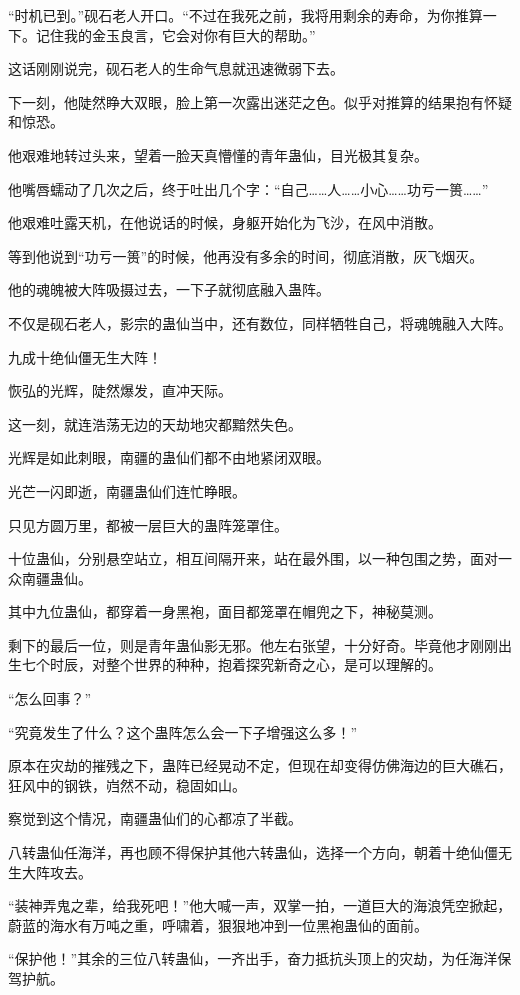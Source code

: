 \begin{this_body}
“时机已到。”砚石老人开口。“不过在我死之前，我将用剩余的寿命，为你推算一下。记住我的金玉良言，它会对你有巨大的帮助。”

这话刚刚说完，砚石老人的生命气息就迅速微弱下去。

下一刻，他陡然睁大双眼，脸上第一次露出迷茫之色。似乎对推算的结果抱有怀疑和惊恐。

他艰难地转过头来，望着一脸天真懵懂的青年蛊仙，目光极其复杂。

他嘴唇蠕动了几次之后，终于吐出几个字：“自己……人……小心……功亏一篑……”

他艰难吐露天机，在他说话的时候，身躯开始化为飞沙，在风中消散。

等到他说到“功亏一篑”的时候，他再没有多余的时间，彻底消散，灰飞烟灭。

他的魂魄被大阵吸摄过去，一下子就彻底融入蛊阵。

不仅是砚石老人，影宗的蛊仙当中，还有数位，同样牺牲自己，将魂魄融入大阵。

九成十绝仙僵无生大阵！

恢弘的光辉，陡然爆发，直冲天际。

这一刻，就连浩荡无边的天劫地灾都黯然失色。

光辉是如此刺眼，南疆的蛊仙们都不由地紧闭双眼。

光芒一闪即逝，南疆蛊仙们连忙睁眼。

只见方圆万里，都被一层巨大的蛊阵笼罩住。

十位蛊仙，分别悬空站立，相互间隔开来，站在最外围，以一种包围之势，面对一众南疆蛊仙。

其中九位蛊仙，都穿着一身黑袍，面目都笼罩在帽兜之下，神秘莫测。

剩下的最后一位，则是青年蛊仙影无邪。他左右张望，十分好奇。毕竟他才刚刚出生七个时辰，对整个世界的种种，抱着探究新奇之心，是可以理解的。

“怎么回事？”

“究竟发生了什么？这个蛊阵怎么会一下子增强这么多！”

原本在灾劫的摧残之下，蛊阵已经晃动不定，但现在却变得仿佛海边的巨大礁石，狂风中的钢铁，岿然不动，稳固如山。

察觉到这个情况，南疆蛊仙们的心都凉了半截。

八转蛊仙任海洋，再也顾不得保护其他六转蛊仙，选择一个方向，朝着十绝仙僵无生大阵攻去。

“装神弄鬼之辈，给我死吧！”他大喊一声，双掌一拍，一道巨大的海浪凭空掀起，蔚蓝的海水有万吨之重，呼啸着，狠狠地冲到一位黑袍蛊仙的面前。

“保护他！”其余的三位八转蛊仙，一齐出手，奋力抵抗头顶上的灾劫，为任海洋保驾护航。


\end{this_body}

